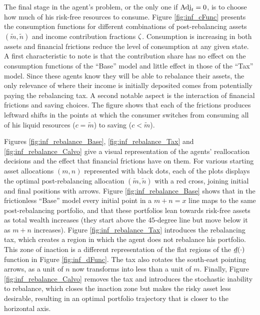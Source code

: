 \documentclass[./RiskyContrib.tex]{subfiles}
\begin{document}


The final stage in the agent's problem, or the only one if $\text{Adj}_t=0$, is
to choose how much of his risk-free resources to consume. Figure \ref{fig:inf_cFunc}
presents the consumption functions for different combinations of post-rebalancing
assets $(\tilde{m}, \tilde{n})$ and income contribution fractions $\zeta$. Consumption
is increasing in both assets and financial frictions reduce the
level of consumption at any given state. A first characteristic to note is that
the contribution share has no effect on the consumption functions of the ``Base'' model
and little effect in those of the ``Tax'' model. Since these agents know they will be
able to rebalance their assets, the only relevance of where their income is initially
deposited comes from potentially paying the rebalancing tax. A second notable aspect is
the interaction of financial frictions and saving choices. The figure shows that each
of the frictions produces leftward shifts in the points at which the consumer switches
from consuming all of his liquid resources ($c = \tilde{m}$) to saving ($c < \tilde{m}$).






Figures \ref{fig:inf_rebalance_Base}, \ref{fig:inf_rebalance_Tax} and
\ref{fig:inf_rebalance_Calvo} give a visual representation of the agents'
reallocation decisions and the effect that financial frictions have on them.
For various starting asset allocations $(m,n)$ represented with black dots,
each of the plots displays the optimal post-rebalancing allocation
$(\tilde{m},\tilde{n})$  with a red cross, joining initial and final positions
with arrows. Figure \ref{fig:inf_rebalance_Base} shows that in the frictionless
``Base'' model every initial point in a $m+n=x$ line maps to the same post-rebalancing
portfolio, and that these portfolios lean towards risk-free assets as total wealth
increases (they start above the $45$-degree line but move below it as $m+n$ increases).
Figure \ref{fig:inf_rebalance_Tax} introduces the rebalancing tax, which creates
a region in which the agent does not rebalance his portfolio. This zone of
inaction is a different representation of the flat regions of the $\underline{d}(\cdot)$
function in Figure \ref{fig:inf_dFunc}. The tax also rotates the south-east pointing
arrows, as a unit of $n$ now transforms into less than a unit of $m$. Finally,
Figure \ref{fig:inf_rebalance_Calvo} removes the tax and introduces the stochastic
inability to rebalance, which closes the inaction zone but makes the risky asset
less desirable, resulting in an optimal portfolio trajectory that is closer to
the horizontal axis.
\end{document}
